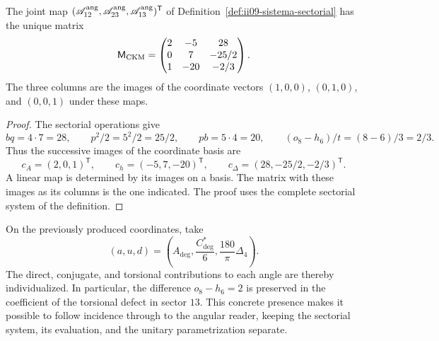 \begin{theorem}
\label{thm:ii09-matriz-sectorial}
The joint map
\((\mathscr A_{12}^{\rm ang},\mathscr A_{23}^{\rm ang},
\mathscr A_{13}^{\rm ang})^{\mathsf T}\) of
Definition~\ref{def:ii09-sistema-sectorial} has the unique matrix
\[
 \mathsf M_{\rm CKM}=
 \begin{pmatrix}
 2&-5&28\\
 0&7&-25/2\\
 1&-20&-2/3
 \end{pmatrix}.
\]
The three columns are the images of the coordinate vectors
\((1,0,0)\), \((0,1,0)\), and \((0,0,1)\) under these maps.
\end{theorem}
\begin{proof}
The sectorial operations give
\[
 bq=4\cdot7=28,\qquad p^2/2=5^2/2=25/2,
 \qquad pb=5\cdot4=20,\qquad
 (o_8-h_6)/t=(8-6)/3=2/3.
\]
Thus the successive images of the coordinate basis are
\[
 c_A=(2,0,1)^{\mathsf T},\qquad
 c_h=(-5,7,-20)^{\mathsf T},\qquad
 c_\Delta=(28,-25/2,-2/3)^{\mathsf T}.
\]
A linear map is determined by its images on a
basis. The matrix with these images as its columns is the one indicated.
The proof uses the complete sectorial system of the definition.
\end{proof}

On the previously produced coordinates, take
\[
 (a,u,d)=\left(A_{\deg},\frac{C^*_{\deg}}6,
                       \frac{180}{\pi}\Delta_4\right).
\]
The direct, conjugate, and torsional contributions to each angle
are thereby individualized. In particular, the difference
\(o_8-h_6=2\) is preserved in the coefficient of the torsional
defect in sector \(13\). This concrete presence makes it possible to follow
incidence through to the angular reader, keeping the sectorial
system, its evaluation, and the unitary parametrization separate.
